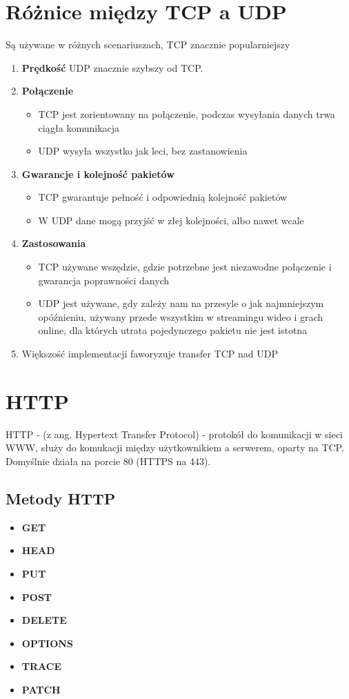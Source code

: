 \documentclass[]{article}
\begin{document}
\section{Różnice między TCP a UDP}
Są używane w różnych scenariuszach, TCP znacznie popularniejszy
\begin{enumerate}
    \item \textbf{Prędkość} UDP znacznie szybszy od TCP.
    \item \textbf{Połączenie} 
    \begin{itemize}
        \item TCP jest zorientowany na połączenie, podczas wysyłania danych trwa ciągła komunikacja
        \item UDP wysyła wszystko jak leci, bez zastanowienia
    \end{itemize}
    \item \textbf{Gwarancje i kolejność pakietów}
        \begin{itemize}
        \item TCP gwarantuje pełność i odpowiednią kolejność pakietów
        \item W UDP dane mogą przyjść w złej kolejności, albo nawet wcale
    \end{itemize}
    \item \textbf{Zastosowania}
        \begin{itemize}
        \item TCP używane wszędzie, gdzie potrzebne jest niezawodne połączenie i gwarancja poprawności danych
        \item UDP jest używane, gdy zależy nam na przesyle o jak najmniejszym opóźnieniu, używany przede wszystkim w streamingu wideo i grach online, dla których utrata pojedynczego pakietu nie jest istotna
    \end{itemize}
    \item Większość implementacji faworyzuje transfer TCP nad UDP
\end{enumerate}
\section{HTTP}
HTTP - (z ang. Hypertext Transfer Protocol) - protokół do komunikacji w sieci WWW, służy do komukacji między użytkownikiem a serwerem, oparty na TCP. Domyślnie działa na porcie 80 (HTTPS na 443).
\subsection{Metody HTTP}
\begin{multicols}{2}
\begin{itemize}
    \item \textbf{GET}
    \item \textbf{HEAD}
    \item \textbf{PUT}
    \item \textbf{POST}
    \item \textbf{DELETE}
    \item \textbf{OPTIONS}
    \item \textbf{TRACE}
    \item \textbf{PATCH}
\end{itemize}
\end{multicols}
\end{document}
